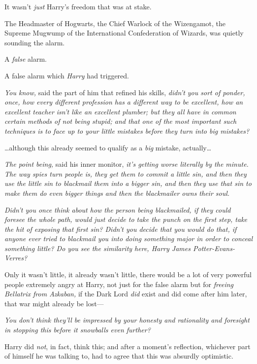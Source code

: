 It wasn’t \emph{just} Harry’s freedom that was at stake.

The Headmaster of Hogwarts, the Chief Warlock of the Wizengamot, the Supreme Mugwump of the International Confederation of Wizards, was quietly sounding the alarm.

A \emph{false} alarm.

A false alarm which \emph{Harry} had triggered.

\emph{You know,} said the part of him that refined his skills, \emph{didn’t you sort of ponder, once, how every different profession has a different way to be excellent, how an excellent teacher isn’t like an excellent plumber; but they all have in common certain methods of not being stupid; and that one of the most important such techniques is to face up to your little mistakes before they turn into \emph{big} mistakes?}

…although this already seemed to qualify as a \emph{big} mistake,
actually…

\emph{The point being,} said his inner monitor, \emph{it’s getting worse literally by the minute. The way spies turn people is, they get them to commit a little sin, and then they use the little sin to blackmail them into a bigger sin, and then they use \emph{that} sin to make them do even bigger things and then the blackmailer owns their soul.}

\emph{Didn’t you once think about how the person being blackmailed, if they could foresee the whole path, would just decide to take the punch on the first step, take the hit of exposing that first sin? Didn’t you decide that you would do that, if anyone ever tried to blackmail you into doing something major in order to conceal something little? Do you see the similarity here, Harry James Potter-Evans-Verres?}

Only it wasn’t little, it already wasn’t little, there would be a lot of very powerful people extremely angry at Harry, not just for the false alarm but for \emph{freeing Bellatrix from Azkaban,} if the Dark Lord \emph{did} exist and did come after him later, that war might already be lost—

\emph{You don’t think they’ll be impressed by your honesty and rationality and foresight in stopping this before it snowballs even further?}

Harry did \emph{not}, in fact, think this; and after a moment’s reflection, whichever part of himself he was talking to, had to agree that this was absurdly optimistic.

